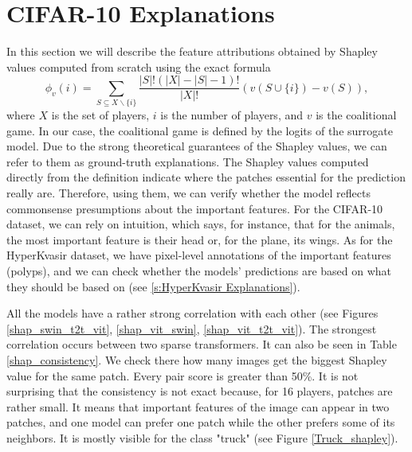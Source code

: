 \documentclass[en]{pracamgr}
\begin{document}
\section{CIFAR-10 Explanations}
In this section we will describe the feature attributions obtained by Shapley values computed from scratch using the exact formula
  \begin{equation*}
      \phi_v(i) = \sum_{S\subseteq X\backslash \{i\}} \frac{|S|!(|X|-|S|-1)!}{|X|!}\left(v(S \cup \{i\}) - v(S)\right),
  \end{equation*}
where $X$ is the set of players, $i$ is the number of players, and $v$ is the coalitional game. In our case, the coalitional game is defined by the logits of the surrogate model. Due to the strong theoretical guarantees of the Shapley values, we can refer to them as ground-truth explanations. The Shapley values computed directly from the definition indicate where the patches essential for the prediction really are. Therefore, using them, we can verify whether the model reflects commonsense presumptions about the important features. For the CIFAR-10 dataset, we can rely on intuition, which says, for instance, that for the animals, the most important feature is their head or, for the plane, its wings. As for the HyperKvasir dataset, we have pixel-level annotations of the important features (polyps), and we can check whether the models' predictions are based on what they should be based on (see \ref{s:HyperKvasir Explanations}).





All the models have a rather strong correlation with each other (see Figures \ref{shap_swin_t2t_vit}, \ref{shap_vit_swin}, \ref{shap_vit_t2t_vit}). The strongest correlation occurs between two sparse transformers. It can also be seen in Table \ref{shap_consistency}. We check there how many images get the biggest Shapley value for the same patch. Every pair score is greater than 50\%. It is not surprising that the consistency is not exact because, for 16 players, patches are rather small. It means that important features of the image can appear in two patches, and one model can prefer one patch while the other prefers some of its neighbors. It is mostly visible for the class "truck" (see Figure \ref{Truck_shapley}).
\end{document}
